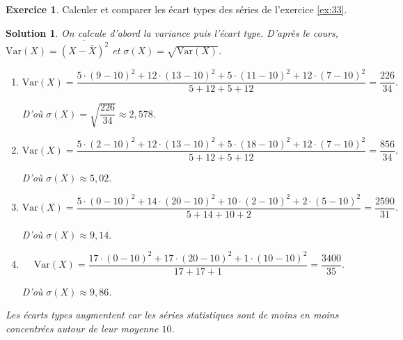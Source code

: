 \documentclass[a4paper, 14pt]{extarticle}
\theoremstyle{plain}
\newtheorem*{sol}{Solution}
\theoremstyle{definition}
\newtheorem{ex}{Exercice}
\newcommand{\Var}[1]{\text{Var}(#1)}
\newcommand{\exe}[2]{
		\begin{ex} #1  \end{ex}
		\begin{sol} #2 \end{sol}
	}
\newcommand{\exe}[2]{
		\begin{ex} #1  \end{ex}
	}
\begin{document}
\exe{
	Calculer et comparer les écart types des séries de l'exercice \ref{ex:33}.
}{
	On calcule d'abord la variance puis l'écart type.
	D'après le cours, $\Var{X} = \overline{(X - \overline{X})^2}$ et $\sigma(X) = \sqrt{\Var{X}}$.
	
	\begin{enumerate}
		\item 
			\[ \Var{X} = \dfrac{5\cdot(9-10)^2 + 12 \cdot(13-10)^2 + 5\cdot(11-10)^2 + 12 \cdot(7-10)^2}{5+12+5+12} = \dfrac{226}{34}. \]
		
		D'où $\sigma(X) = \sqrt{\dfrac{226}{34}} \approx 2,578$.
		
		\item  
			\[\Var{X} = \dfrac{5\cdot(2-10)^2 + 12 \cdot(13-10)^2 + 5\cdot(18-10)^2 + 12 \cdot(7-10)^2}{5+12+5+12} = \dfrac{856}{34}. \]
		
		D'où $\sigma(X) \approx 5,02$.
		
		\item  
			\[\Var{X} = \dfrac{5\cdot(0-10)^2 + 14 \cdot(20-10)^2 + 10\cdot(2-10)^2 + 2 \cdot(5-10)^2}{5+14+10+2} = \dfrac{2590}{31} . \]
		
		D'où $\sigma(X) \approx 9,14.$
		
		\item  
			\[\Var{X} = \dfrac{17\cdot(0-10)^2 + 17 \cdot(20-10)^2 + 1\cdot(10-10)^2 }{17+17+1} = \dfrac{3400}{35}. \]
		
		D'où $\sigma(X) \approx 9,86$.
	\end{enumerate}

	Les écarts types augmentent car les séries statistiques sont de moins en moins concentrées autour de leur moyenne $10$.
}
\end{document}
